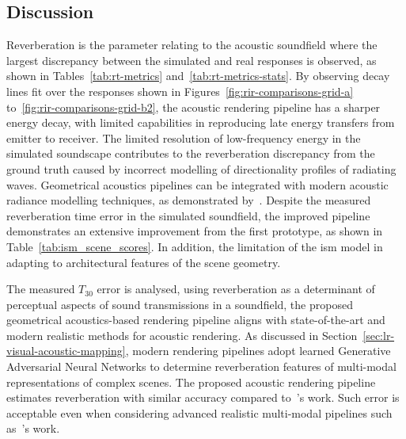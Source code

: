 \subsection{Discussion}
Reverberation is the parameter relating to the acoustic soundfield where the largest discrepancy between the simulated and real responses is observed, as shown in Tables~\ref{tab:rt-metrics} and~\ref{tab:rt-metrics-stats}. By observing decay lines fit over the responses shown in Figures~\ref{fig:rir-comparisons-grid-a} to~\ref{fig:rir-comparisons-grid-b2}, the acoustic rendering pipeline has a sharper energy decay, with limited capabilities in reproducing late energy transfers from emitter to receiver. The limited resolution of low-frequency energy in the simulated soundscape contributes to the reverberation discrepancy from the ground truth caused by incorrect modelling of directionality profiles of radiating waves. Geometrical acoustics pipelines can be integrated with modern acoustic radiance modelling techniques, as demonstrated by~\cite{siltanen2010room}. Despite the measured reverberation time error in the simulated soundfield, the improved pipeline demonstrates an extensive improvement from the first prototype, as shown in Table~\ref{tab:ism_scene_scores}. In addition, the limitation of the \acrshort{ism} model in adapting to architectural features of the scene geometry. \par
The measured $T_{30}$ error is analysed, using reverberation as a determinant of perceptual aspects of sound transmissions in a soundfield, the proposed geometrical acoustics-based rendering pipeline aligns with state-of-the-art and modern realistic methods for acoustic rendering. As discussed in Section~\ref{sec:lr-visual-acoustic-mapping}, modern rendering pipelines adopt learned Generative Adversarial Neural Networks to determine reverberation features of multi-modal representations of complex scenes. The proposed acoustic rendering pipeline estimates reverberation with similar accuracy compared to~\cite{Singh_2021_ICCV}'s work. Such error is acceptable even when considering advanced realistic multi-modal pipelines such as~\cite{schissler2014high}'s work.\par

